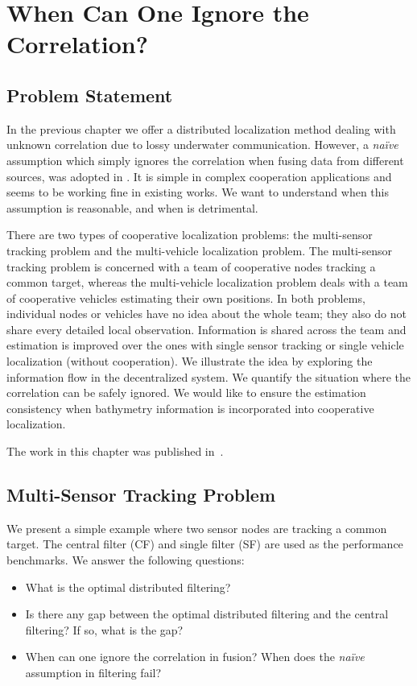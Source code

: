 
\chapter{When Can One Ignore the Correlation?}
\label{ch:naive}

\section{Problem Statement}

In the previous chapter we offer a distributed localization method dealing with unknown correlation due to lossy underwater communication. However, a \textit{na\"ive} assumption which simply ignores the correlation when fusing data from different sources, was adopted in \cite{William2015Journal,Tao2010}. It is simple in complex cooperation applications and seems to be working fine in existing works. We want to understand when this assumption is reasonable, and when is detrimental. 

There are two types of cooperative localization problems: the multi-sensor tracking problem and the multi-vehicle localization problem. The multi-sensor tracking problem is concerned with a team of cooperative nodes tracking a common target, whereas the multi-vehicle localization problem deals with a team of cooperative vehicles estimating their own positions. In both problems, individual nodes or vehicles have no idea about the whole team; they also do not share every detailed local observation. Information is shared across the team and estimation is improved over the ones with single sensor tracking or single vehicle localization (without cooperation). We illustrate the idea by exploring the information flow in the decentralized system. We quantify the situation where the correlation can be safely ignored. We would like to ensure the estimation consistency when bathymetry information is incorporated into cooperative localization.

The work in this chapter was published in~\cite{Gao2017}.

\section{Multi-Sensor Tracking Problem}

We present a simple example where two sensor nodes are tracking a common target. The central filter (CF) and single filter (SF) are used as the performance benchmarks. We answer the following questions:
\begin{itemize}
  \item What is the optimal distributed filtering?
  \item Is there any gap between the optimal distributed filtering and the central filtering? If so, what is the gap?
  \item When can one ignore the correlation in fusion? When does the \textit{na\"ive} assumption in filtering fail?
\end{itemize}

